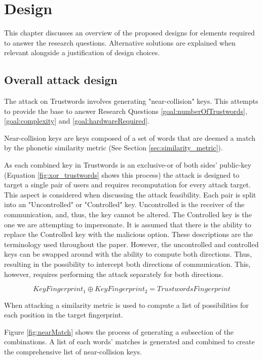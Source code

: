 \chapter{Design}
\label{cha:Design}

This chapter discusses an overview of the proposed designs for elements required to answer the research questions. Alternative solutions are explained when relevant alongside a justification of design choices.

\section{Overall attack design}

The attack on Trustwords involves generating "near-collision" keys. 
This attempts to provide the base to answer Research Questions \ref{goal:numberOfTrustwords}, \ref{goal:complexity} and \ref{goal:hardwareRequired}.

Near-collision keys are keys composed of a set of words that are deemed a match by the phonetic similarity metric (See Section \ref{sec:similarity_metric}). 

As each combined key in Trustwords is an exclusive-or of both sides' public-key (Equation \ref{fig:xor_trustwords} shows this process) the attack is designed to target a single pair of users and requires recomputation for every attack target. This aspect is considered when discussing the attack feasibility. Each pair is split into an "Uncontrolled" or "Controlled" key. Uncontrolled is the receiver of the communication, and, thus, the key cannot be altered. The Controlled key is the one we are attempting to impersonate. It is assumed that there is the ability to replace the Controlled key with the malicious option. These descriptions are the terminology used throughout the paper. However, the uncontrolled and controlled keys can be swapped around with the ability to compute both directions. Thus, resulting in the possibility to intercept both directions of communication. This, however, requires performing the attack separately for both directions.

\begin{equation}
    KeyFingerprint_{1} \oplus KeyFingerprint_{2} = TrustwordsFingerprint
\end{equation}
\label{fig:xor_trustwords}

When attacking a similarity metric is used to compute a list of possibilities for each position in the target fingerprint.

Figure \ref{fig:nearMatch} shows the process of generating a subsection of the combinations. A list of each words' matches is generated and combined to create the comprehensive list of near-collision keys.

